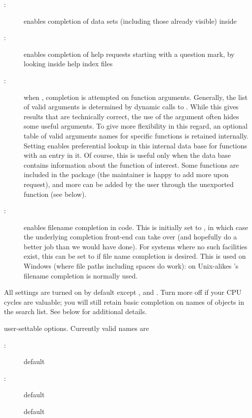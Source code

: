 \begin{Arguments}
\begin{ldescription}
\begin{description}
\item[:]  enables completion of data sets (including
those already visible) inside  

\item[:]  enables completion of help requests starting
with a question mark, by looking inside help index files 

\item[:]  when , completion is
attempted on function arguments.  Generally, the list of valid
arguments is determined by dynamic calls to .
While this gives results that are technically correct, the use
of the  argument often hides some useful arguments.
To give more flexibility in this regard, an optional table of
valid arguments names for specific functions is retained
internally.  Setting  enables preferential
lookup in this internal data base for functions with an entry in
it.  Of course, this is useful only when the data base contains
information about the function of interest.  Some functions are
included in the package (the maintainer is happy to add more
upon request), and more can be added by the user through the
unexported function  (see below).


\item[:]  enables filename completion in \R{} code.  This
is initially set to , in which case the underlying
completion front-end can take over (and hopefully do a better
job than we would have done).  For systems where no such
facilities exist, this can be set to  if file name
completion is desired.  This is used on Windows (where file
paths including spaces do work): on Unix-alikes
's filename completion is normally used.



\end{description}


All settings are turned on by default except ,
 and .  Turn more off if your CPU cycles are
valuable; you will still retain basic completion on names of objects
in the search list.  See below for additional details.

\item[\code{name, ...}]  user-settable options.  Currently valid names are
\begin{description}

\item[:]  default  
\item[:]  default  
\item[]  default  


\end{description}
\end{ldescription}
\end{Arguments}
